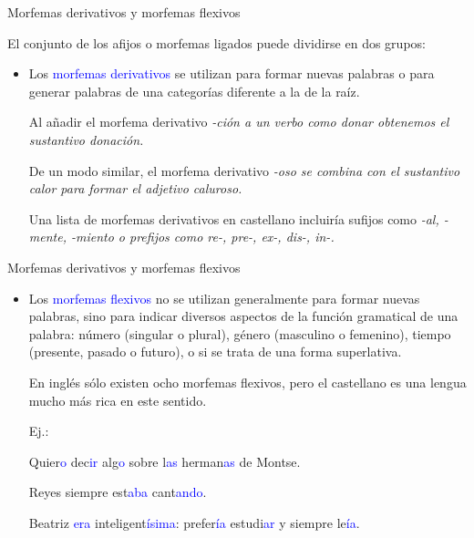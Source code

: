 \documentclass{beamer}
\begin{document}
\begin{frame}{Morfemas derivativos y morfemas flexivos}

El conjunto de los afijos o morfemas ligados puede dividirse en dos grupos:
\begin{itemize}
	\item Los \textcolor{blue}{morfemas derivativos} se utilizan para formar nuevas palabras o para generar palabras de una categorías diferente a la de la raíz.
	
	Al añadir el morfema derivativo \it{-ción} a un verbo como \it{donar} obtenemos el sustantivo \it{donación}. 
	
	De un modo similar, el morfema derivativo \it{-oso} se combina con el sustantivo \it{calor} para formar el adjetivo \it{caluroso}.
	
	Una lista de morfemas derivativos en castellano incluiría sufijos como \it{-al, -mente, -miento} o prefijos como \it{re-, pre-, ex-, dis-, in-}. 
\end{itemize}

\end{frame}

\begin{frame}{Morfemas derivativos y morfemas flexivos}

\begin{itemize}
	\item Los \textcolor{blue}{morfemas flexivos} no se utilizan generalmente para formar nuevas palabras, sino para indicar diversos aspectos de la función gramatical de una palabra: número (singular o plural), género (masculino o femenino), tiempo (presente, pasado o futuro), o si se trata de una forma superlativa.
	
	En inglés sólo existen ocho morfemas flexivos, pero el castellano es una lengua mucho más rica en este sentido.
	
    Ej.:
    
    Quier\textcolor{blue}{o} dec\textcolor{blue}{ir} alg\textcolor{blue}{o} sobre l\textcolor{blue}{as} herman\textcolor{blue}{as} de Montse.
    
    Reyes siempre est\textcolor{blue}{aba} cant\textcolor{blue}{ando}.

	Beatriz \textcolor{blue}{era} inteligent\textcolor{blue}{ísima}: prefer\textcolor{blue}{ía} estudi\textcolor{blue}{ar} y siempre le\textcolor{blue}{ía}.	
\end{itemize}

\end{frame}
\end{document}
